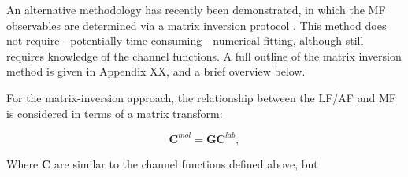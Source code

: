 An alternative methodology has recently been demonstrated, in which the MF observables are determined via a matrix inversion protocol \cite{gregory2021MolecularFramePhotoelectron}. This method does not require - potentially time-consuming - numerical fitting, although still requires knowledge of the channel functions. A full outline of the matrix inversion method is given in Appendix XX, and a brief overview below.

For the matrix-inversion approach, the relationship between the LF/AF and MF is considered in terms of a matrix transform:

\begin{equation}
\mathbf{C}^{mol}=\mathbf{G}\mathbf{C}^{lab},\label{eq:basic}
\end{equation}

Where $\mathbf{C}$ are similar to the channel functions defined above, but 


